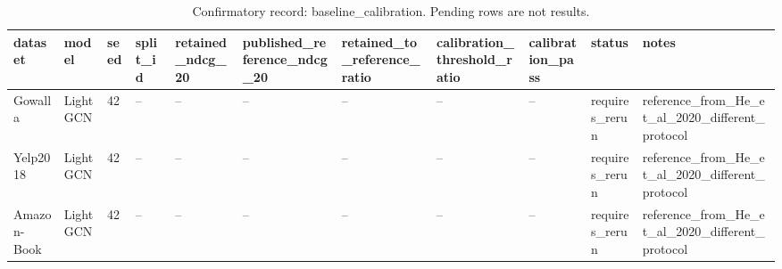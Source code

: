 \begin{table}[t]
\centering
\caption{Confirmatory record: baseline\_calibration. Pending rows are not results.}
\begin{tabular}{lllllllllll}
\toprule
\textbf{dataset} & \textbf{model} & \textbf{seed} & \textbf{split\_id} & \textbf{retained\_ndcg\_20} & \textbf{published\_reference\_ndcg\_20} & \textbf{retained\_to\_reference\_ratio} & \textbf{calibration\_threshold\_ratio} & \textbf{calibration\_pass} & \textbf{status} & \textbf{notes} \\
\midrule
Gowalla & LightGCN & 42 & -- & -- & -- & -- & -- & -- & requires\_rerun & reference\_from\_He\_et\_al\_2020\_different\_protocol \\
Yelp2018 & LightGCN & 42 & -- & -- & -- & -- & -- & -- & requires\_rerun & reference\_from\_He\_et\_al\_2020\_different\_protocol \\
Amazon-Book & LightGCN & 42 & -- & -- & -- & -- & -- & -- & requires\_rerun & reference\_from\_He\_et\_al\_2020\_different\_protocol \\
\bottomrule
\end{tabular}
\end{table}
